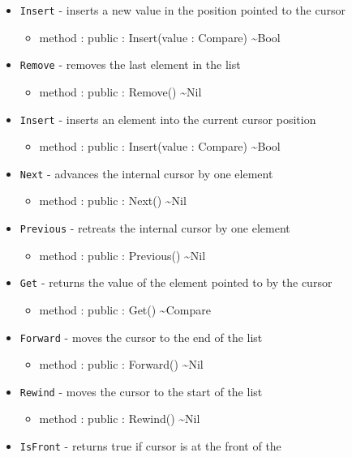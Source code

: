 \documentclass[11pt]{article}
\begin{document}
\begin{itemize}
\item \texttt{Insert} - inserts a new value in the position pointed to
  the cursor
  \begin{itemize}
  \item method : public : Insert(value : Compare) \textasciitilde Bool
  \end{itemize}
\item \texttt{Remove} - removes the last element in the list
  \begin{itemize}
  \item method : public : Remove() \textasciitilde Nil
  \end{itemize}
\item \texttt{Insert} - inserts an element into the current cursor
  position
  \begin{itemize}
  \item method : public : Insert(value : Compare) \textasciitilde Bool
  \end{itemize}
\item \texttt{Next} - advances the internal cursor by one element
  \begin{itemize}
  \item method : public : Next() \textasciitilde Nil
  \end{itemize}
\item \texttt{Previous} - retreats the internal cursor by one element
  \begin{itemize}
  \item method : public : Previous() \textasciitilde Nil
  \end{itemize}
\item \texttt{Get} - returns the value of the element pointed to by
  the cursor
  \begin{itemize}
  \item method : public : Get() \textasciitilde Compare
  \end{itemize}
\item \texttt{Forward} - moves the cursor to the end of the list
  \begin{itemize}
  \item method : public : Forward() \textasciitilde Nil
  \end{itemize}
\item \texttt{Rewind} - moves the cursor to the start of the list
  \begin{itemize}
  \item method : public : Rewind() \textasciitilde Nil
  \end{itemize}
\item \texttt{IsFront} - returns true if cursor is at the front of the

\end{itemize}
\end{document}
